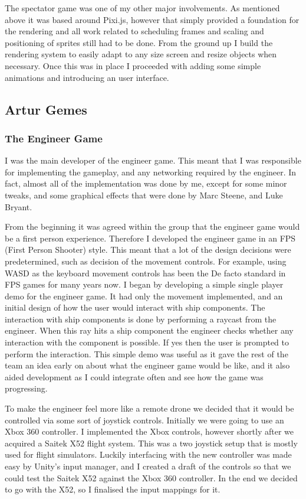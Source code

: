 \documentclass[a4paper,11pt]{article}
\begin{document}
The spectator game was one of my other major involvements. As mentioned above it was based around Pixi.js, however that simply provided a foundation for the rendering and all work related to scheduling frames and scaling and positioning of sprites still had to be done. From the ground up I build the rendering system to easily adapt to any size screen and resize objects when necessary. Once this was in place I proceeded with adding some simple animations and introducing an user interface.

\clearpage

\subsection{Artur Gemes}

\subsubsection{The Engineer Game}

I was the main developer of the engineer game. This meant that I was responsible for implementing the gameplay, and any networking required by the engineer. In fact, almost all of the implementation was done by me, except for some minor tweaks, and some graphical effects that were done by Marc Steene, and Luke Bryant.

From the beginning it was agreed within the group that the engineer game would be a first person experience. Therefore I developed the engineer game in an FPS (First Person Shooter) style. This meant that a lot of the design decisions were predetermined, such as decision of the movement controls. For example, using WASD as the keyboard movement controls has been the De facto standard in FPS games for many years now. I began by developing a simple single player demo for the engineer game. It had only the movement implemented, and an initial design of how the user would interact with ship components. The interaction with ship components is done by performing a raycast from the engineer. When this ray hits a ship component the engineer checks whether any interaction with the component is possible. If yes then the user is prompted to perform the interaction. This simple demo was useful as it gave the rest of the team an idea early on about what the engineer game would be like, and it also aided development as I could integrate often and see how the game was progressing.

To make the engineer feel more like a remote drone we decided that it would be controlled via some sort of joystick controls. Initially we were going to use an Xbox 360 controller. I implemented the Xbox controls, however shortly after we acquired a Saitek X52 flight system. This was a two joystick setup that is mostly used for flight simulators. Luckily interfacing with the new controller was made easy by Unity’s input manager, and I created a draft of the controls so that we could test the Saitek X52 against the Xbox 360 controller. In the end we decided to go with the X52, so I finalised the input mappings for it.
\end{document}
